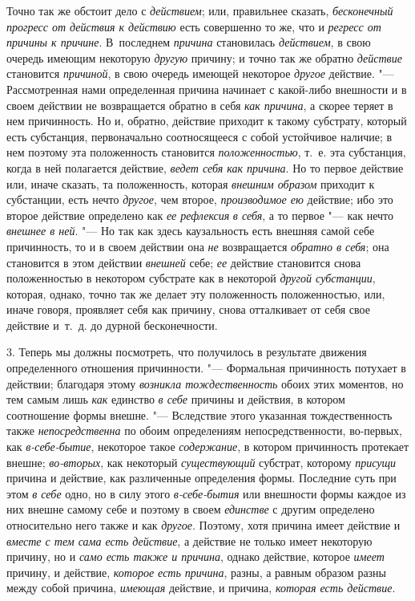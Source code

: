 Точно так же обстоит дело с {\em действием}; или,
правильнее сказать, {\em бесконечный прогресс от
действия к действию} есть совершенно то же, что и
{\em регресс от причины к причине}. В~последнем
{\em причина} становилась
{\em действием}, в свою очередь имеющим некоторую
{\em другую} причину; и точно так же обратно
{\em действие} становится
{\em причиной}, в свою очередь имеющей некоторое
{\em другое} действие. "--- Рассмотренная нами
определенная причина начинает с какой-либо внешности и в своем действии не
возвращается обратно в себя {\em как причина}, а скорее
теряет в нем причинность. Но и, обратно, действие приходит к такому
субстрату, который есть субстанция, первоначально соотносящееся с собой
устойчивое наличие; в нем поэтому эта положенность становится
{\em положенностью}, т.~е. эта субстанция, когда в ней
полагается действие, {\em ведет себя как причина}. Но
то первое действие или, иначе сказать, та положенность, которая
{\em внешним образом} приходит к субстанции, есть нечто
{\em другое}, чем второе,
{\em производимое ею} действие; ибо это второе действие
определено как {\em ее рефлексия}
{\em в себя}, а то первое "--- как нечто
{\em внешнее в ней}. "--- Но так как здесь каузальность
есть внешняя самой себе причинность, то и в своем действии она
{\em не} возвращается {\em обратно
в себя}; она становится в этом действии {\em внешней}
себе; {\em ее} действие становится снова положенностью
в некотором субстрате как в некоторой {\em другой
субстанции}, которая, однако, точно так же делает эту положенность
положенностью, или, иначе говоря, проявляет себя как причину, снова
отталкивает от себя свое действие и~т.~д. до дурной бесконечности.

3. Теперь мы должны посмотреть, что получилось в результате движения
определенного отношения причинности. "--- Формальная причинность потухает в
действии; благодаря этому {\em возникла
тождественность} обоих этих моментов, но тем самым лишь
{\em как} единство {\em в себе}
причины и действия, в котором соотношение формы внешне. "--- Вследствие этого
указанная тождественность также {\em непосредственна}
по обоим определениям непосредственности, во-первых, как
{\em в-себе-бытие}, некоторое такое
{\em содержание}, в котором причинность протекает
внешне; {\em во-вторых}, как некоторый
{\em существующий} субстрат, которому
{\em присущи} причина и действие, как различенные
определения формы. Последние суть при этом {\em в себе}
одно, но в силу этого {\em в-себе-бытия} или внешности
формы каждое из них внешне самому себе и поэтому в своем
{\em единстве} с другим определено относительно него
также и как {\em другое}. Поэтому, хотя причина имеет
действие и {\em вместе с тем сама есть действие}, а
действие не только имеет некоторую причину, но и
{\em само есть также и причина}, однако действие,
которое {\em имеет} причину, и действие,
{\em которое есть причина}, разны, а равным образом
разны между собой причина, {\em имеющая} действие, и
причина, {\em которая есть действие}.

